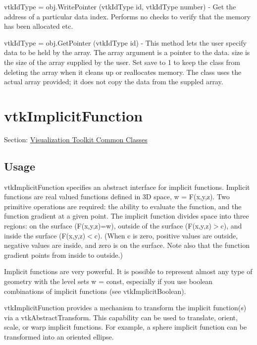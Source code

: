 \begin{DoxyItemize}
\item {\ttfamily vtk\-Id\-Type = obj.\-Write\-Pointer (vtk\-Id\-Type id, vtk\-Id\-Type number)} -\/ Get the address of a particular data index. Performs no checks to verify that the memory has been allocated etc.  
\item {\ttfamily vtk\-Id\-Type = obj.\-Get\-Pointer (vtk\-Id\-Type id)} -\/ This method lets the user specify data to be held by the array. The array argument is a pointer to the data. size is the size of the array supplied by the user. Set save to 1 to keep the class from deleting the array when it cleans up or reallocates memory. The class uses the actual array provided; it does not copy the data from the suppled array.  
\end{DoxyItemize}\hypertarget{vtkcommon_vtkimplicitfunction}{}\section{vtk\-Implicit\-Function}\label{vtkcommon_vtkimplicitfunction}
Section\-: \hyperlink{sec_vtkcommon}{Visualization Toolkit Common Classes} \hypertarget{vtkwidgets_vtkxyplotwidget_Usage}{}\subsection{Usage}\label{vtkwidgets_vtkxyplotwidget_Usage}
vtk\-Implicit\-Function specifies an abstract interface for implicit functions. Implicit functions are real valued functions defined in 3\-D space, w = F(x,y,z). Two primitive operations are required\-: the ability to evaluate the function, and the function gradient at a given point. The implicit function divides space into three regions\-: on the surface (F(x,y,z)=w), outside of the surface (F(x,y,z)$>$c), and inside the surface (F(x,y,z)$<$c). (When c is zero, positive values are outside, negative values are inside, and zero is on the surface. Note also that the function gradient points from inside to outside.)

Implicit functions are very powerful. It is possible to represent almost any type of geometry with the level sets w = const, especially if you use boolean combinations of implicit functions (see vtk\-Implicit\-Boolean).

vtk\-Implicit\-Function provides a mechanism to transform the implicit function(s) via a vtk\-Abstract\-Transform. This capability can be used to translate, orient, scale, or warp implicit functions. For example, a sphere implicit function can be transformed into an oriented ellipse.

